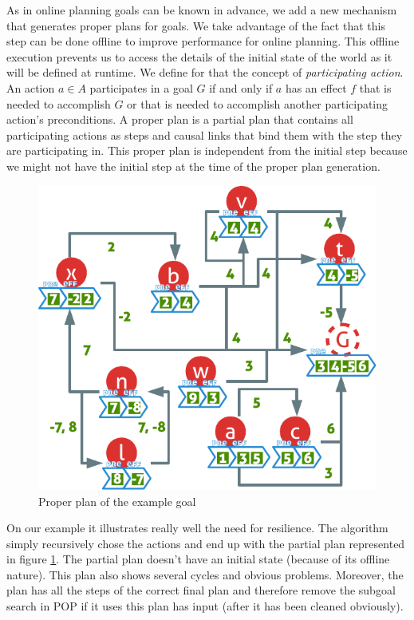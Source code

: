 \documentclass[]{article}
\begin{document}
As in online planning goals can be known in advance, we add a new
mechanism that generates proper plans for goals. We take advantage of
the fact that this step can be done offline to improve performance for
online planning. This offline execution prevents us to access the
details of the initial state of the world as it will be defined at
runtime. We define for that the concept of \emph{participating action}.
An action \(a \in A\) participates in a goal \(G\) if and only if \(a\)
has an effect \(f\) that is needed to accomplish \(G\) or that is needed
to accomplish another participating action's preconditions. A proper
plan is a partial plan that contains all participating actions as steps
and causal links that bind them with the step they are participating in.
This proper plan is independent from the initial step because we might
not have the initial step at the time of the proper plan generation.

\begin{figure}[htbp]
\centering
\includegraphics{graphics/proper.pdf}
\caption{Proper plan of the example goal\label{fig:proper}}
\end{figure}

On our example it illustrates really well the need for resilience. The
algorithm simply recursively chose the actions and end up with the
partial plan represented in figure \ref{fig:proper}. The partial plan
doesn't have an initial state (because of its offline nature). This plan
also shows several cycles and obvious problems. Moreover, the plan has
all the steps of the correct final plan and therefore remove the subgoal
search in POP if it uses this plan has input (after it has been cleaned
obviously).
\end{document}
